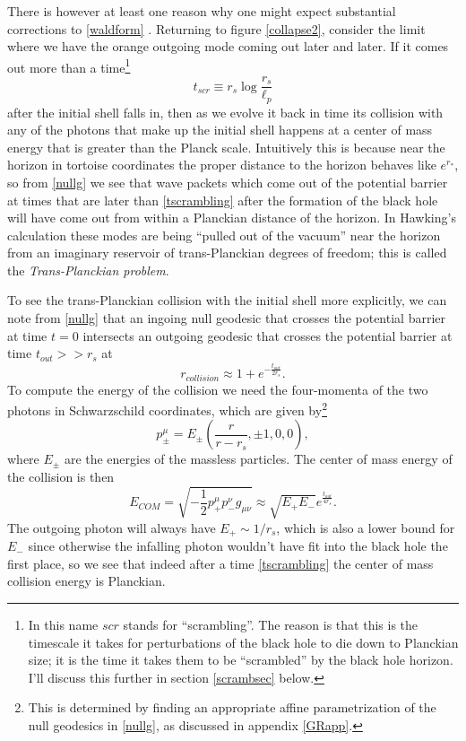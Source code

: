 \documentclass[12pt]{article}
\newcommand{\be}{\begin{equation}}
\newcommand{\ee}{\end{equation}}
\begin{document}
There is however at least one reason why one might expect substantial corrections to \eqref{waldform} \cite{'tHooft:1984re,Unruh:1994zw,Corley:1996ar}.  Returning to figure \ref{collapse2}, consider the limit where we have the orange outgoing mode coming out later and later.  If it comes out more than a time\footnote{In this name $scr$ stands for ``scrambling''. The reason is that this is the timescale it takes for perturbations of the black hole to die down to Planckian size; it is the time it takes them to be ``scrambled'' by the black hole horizon.  I'll discuss this further in section \ref{scrambsec} below.}
\be\label{tscrambling}
t_{scr}\equiv r_s\log \frac{r_s}{\ell_p}
\ee
after the initial shell falls in, then as we evolve it back in time its collision with any of the photons that make up the initial shell happens at a center of mass energy that is greater than the Planck scale.  Intuitively this is because near the horizon in tortoise coordinates the proper distance to the horizon behaves like $e^{r_*}$, so from \eqref{nullg} we see that wave packets which come out of the potential barrier at times that are later than \eqref{tscrambling} after the formation of the black hole will have come out from within a Planckian distance of the horizon.  In Hawking's calculation these modes are being ``pulled out of the vacuum'' near the horizon from an imaginary reservoir of trans-Planckian degrees of freedom;  this is called the \textit{Trans-Planckian problem}.

To see the trans-Planckian collision with the initial shell more explicitly,  we can note from \eqref{nullg} that an ingoing null geodesic that crosses the potential barrier at time $t=0$ intersects an outgoing geodesic that crosses the potential barrier at time $t_{out}>>r_s$ at
\be
r_{collision}\approx 1+e^{-\frac{t_{out}}{2r_s}}.
\ee
To compute the energy of the collision we need the four-momenta of the two photons in Schwarzschild coordinates, which are given by\footnote{This is determined by finding an appropriate affine parametrization of the null geodesics in \eqref{nullg}, as discussed in appendix \ref{GRapp}.}
\be
p^\mu_\pm=E_\pm\left(\frac{r}{r-r_s},\pm 1,0,0\right),  
\ee
where $E_\pm$ are the energies of the massless particles.  The center of mass energy of the collision is then
\be
E_{COM}=\sqrt{-\frac{1}{2}p_+^\mu p_-^\nu g_{\mu\nu}}\approx\sqrt{E_+ E_-}e^{\frac{t_{out}}{4r_s}}.
\ee
The outgoing photon will always have $E_+\sim 1/r_s$, which is also a lower bound for $E_-$ since otherwise the infalling photon wouldn't have fit into the black hole the first place, so we see that indeed after a time \eqref{tscrambling} the center of mass collision energy is Planckian.  
\end{document}
